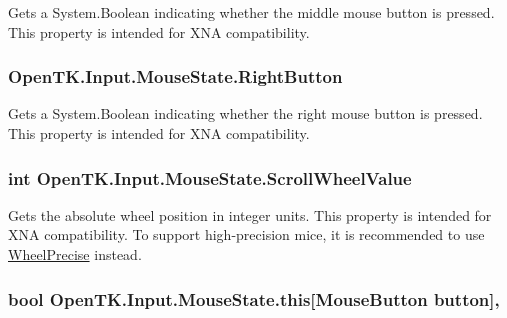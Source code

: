 Gets a System.\-Boolean indicating whether the middle mouse button is pressed. This property is intended for X\-N\-A compatibility. 

\hypertarget{struct_open_t_k_1_1_input_1_1_mouse_state_a8b9002f3148672b78e890e99e6d8d7b7}{
\subsubsection[{Right\-Button}]{ Open\-T\-K.\-Input.\-Mouse\-State.\-Right\-Button\hspace{0.3cm}{\ttfamily [get]}}}\label{struct_open_t_k_1_1_input_1_1_mouse_state_a8b9002f3148672b78e890e99e6d8d7b7}


Gets a System.\-Boolean indicating whether the right mouse button is pressed. This property is intended for X\-N\-A compatibility. 

\hypertarget{struct_open_t_k_1_1_input_1_1_mouse_state_acdb9186e8c68ffad1dd41729d9a215c1}{
\subsubsection[{Scroll\-Wheel\-Value}]{\setlength{\rightskip}{0pt plus 5cm}int Open\-T\-K.\-Input.\-Mouse\-State.\-Scroll\-Wheel\-Value\hspace{0.3cm}{\ttfamily [get]}}}\label{struct_open_t_k_1_1_input_1_1_mouse_state_acdb9186e8c68ffad1dd41729d9a215c1}


Gets the absolute wheel position in integer units. This property is intended for X\-N\-A compatibility. To support high-\/precision mice, it is recommended to use \hyperlink{struct_open_t_k_1_1_input_1_1_mouse_state_a7cccb024aeef61d35a151f97e63e9523}{Wheel\-Precise} instead. 

\hypertarget{struct_open_t_k_1_1_input_1_1_mouse_state_ab17d6377dee4f554214f7872f5f05b61}{
\subsubsection[{this[Mouse\-Button button]}]{\setlength{\rightskip}{0pt plus 5cm}bool Open\-T\-K.\-Input.\-Mouse\-State.\-this\mbox{[}{\bf Mouse\-Button} button\mbox{]}\hspace{0.3cm}{\ttfamily [get]}, {\ttfamily [set]}}}\label{struct_open_t_k_1_1_input_1_1_mouse_state_ab17d6377dee4f554214f7872f5f05b61}


